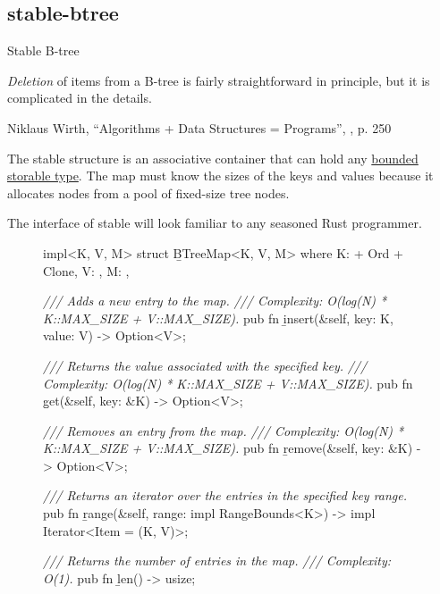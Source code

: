 \documentclass{article}
\begin{document}
\subsection{stable-btree}{Stable B-tree}
\epigraph{
    \emph{Deletion} of items from a B-tree is fairly straightforward in principle, but it is complicated in the details.
}{Niklaus Wirth, ``Algorithms + Data Structures = Programs'', , p. 250}

The \href{https://docs.rs/ic-stable-structures/0.4.0/ic_stable_structures/btreemap/struct.BTreeMap.html}{} stable structure is an associative container that can hold any \href{#storable-types}{bounded storable type}.
  The map must know the sizes of the keys and values because it allocates nodes from a pool of fixed-size tree nodes.

The interface of stable  will look familiar to any seasoned Rust programmer.

\begin{figure}
\begin{code}[rust]
impl<K, V, M> struct \b{BTreeMap}<K, V, M>
where
  K: \href{#bounded-storable-trait}{} + Ord + Clone,
  V: \href{#bounded-storable-trait}{},
  M: \href{#memory}{},
{
    \emph{/// Adds a new entry to the map.}
    \emph{/// Complexity: O(log(N) * K::MAX_SIZE + V::MAX_SIZE).}
    pub fn \b{insert}(&self, key: K, value: V) -> Option<V>;

    \emph{/// Returns the value associated with the specified key.}
    \emph{/// Complexity: O(log(N) * K::MAX_SIZE + V::MAX_SIZE).}
    pub fn \b{get}(&self, key: &K) -> Option<V>;

    \emph{/// Removes an entry from the map.}
    \emph{/// Complexity: O(log(N) * K::MAX_SIZE + V::MAX_SIZE).}
    pub fn \b{remove}(&self, key: &K) -> Option<V>;

    \emph{/// Returns an iterator over the entries in the specified key range.}
    pub fn \b{range}(&self, range: impl RangeBounds<K>) -> impl Iterator<Item = (K, V)>;

    \emph{/// Returns the number of entries in the map.}
    \emph{/// Complexity: O(1).}
    pub fn \b{len}() -> usize;
}
\end{code}
\end{figure}
\end{document}
